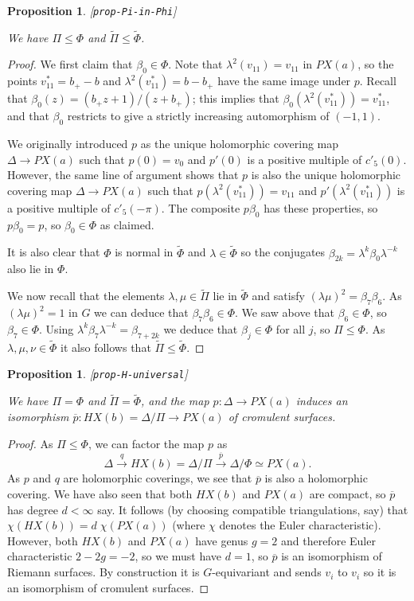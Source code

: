 \documentclass[reqno]{amsart}
\newcommand{\lbl}[1]{\label{#1}\textup{[\texttt{#1}]}\par}
\newcommand{\lbl}{\label}
\newcommand{\Dl}        {\Delta}
\newcommand{\bt}        {\beta}
\newcommand{\lm}        {\lambda}
\newcommand{\xra}       {\xrightarrow}
\newcommand{\ov}[1]     {\overline{#1}}
\newcommand{\tPi}	{\widetilde{\Pi}}
\newcommand{\tPhi}	{\widetilde{\Phi}}
\renewcommand{\:}{\colon}
\newtheorem{proposition}[theorem]{Proposition}
\theoremstyle{definition}
\begin{document}
\begin{proposition}\lbl{prop-Pi-in-Phi}
 We have $\Pi\leq\Phi$ and $\tPi\leq\tPhi$.
\end{proposition}
\begin{proof}
 We first claim that $\bt_0\in\Phi$.  Note that $\lm^2(v_{11})=v_{11}$ in
 $PX(a)$, so the points $v^*_{11}=b_+-b$ and $\lm^2(v^*_{11})=b-b_+$
 have the same image under $p$.  Recall that
 $\bt_0(z)=(b_+z+1)/(z+b_+)$; this implies that
 $\bt_0(\lm^2(v^*_{11}))=v^*_{11}$, and that $\bt_0$ restricts to give
 a strictly increasing automorphism of $(-1,1)$.

 We originally introduced $p$ as the unique holomorphic covering map
 $\Dl\to PX(a)$ such that $p(0)=v_0$ and $p'(0)$ is a positive
 multiple of $c'_5(0)$.  However, the same line of argument shows that
 $p$ is also the unique holomorphic covering map $\Dl\to PX(a)$ such
 that $p(\lm^2(v^*_{11}))=v_{11}$ and $p'(\lm^2(v^*_{11}))$ is a
 positive multiple of $c'_5(-\pi)$.  The composite $p\bt_0$ has these
 properties, so $p\bt_0=p$, so $\bt_0\in\Phi$ as claimed.

 It is also clear that $\Phi$ is normal in $\tPhi$ and $\lm\in\tPhi$
 so the conjugates $\bt_{2k}=\lm^k\bt_0\lm^{-k}$ also lie in $\Phi$.

 We now recall that the elements $\lm,\mu\in\tPi$ lie in $\tPhi$ and
 satisfy $(\lm\mu)^2=\bt_7\bt_6$.  As $(\lm\mu)^2=1$ in $G$ we can
 deduce that $\bt_7\bt_6\in\Phi$.  We saw above that $\bt_6\in\Phi$,
 so $\bt_7\in\Phi$.  Using $\lm^k\bt_7\lm^{-k}=\bt_{7+2k}$ we deduce
 that $\bt_j\in\Phi$ for all $j$, so $\Pi\leq\Phi$.  As
 $\lm,\mu,\nu\in\tPhi$ it also follows that $\tPi\leq\tPhi$.
\end{proof}

\begin{proposition}\lbl{prop-H-universal}
 We have $\Pi=\Phi$ and $\tPi=\tPhi$, and the map $p\:\Dl\to PX(a)$
 induces an isomorphism $\ov{p}\:HX(b)=\Dl/\Pi\to PX(a)$ of cromulent
 surfaces.
\end{proposition}
\begin{proof}
 As $\Pi\leq\Phi$, we can factor the map $p$ as
 \[ \Dl \xra{q} HX(b) = \Dl/\Pi \xra{\ov{p}} \Dl/\Phi \simeq PX(a).
 \]
 As $p$ and $q$ are holomorphic coverings, we see that $\ov{p}$ is
 also a holomorphic covering.  We have also seen that both $HX(b)$ and
 $PX(a)$ are compact, so $\ov{p}$ has degree $d<\infty$ say.  It
 follows (by choosing compatible triangulations, say) that
 $\chi(HX(b))=d\;\chi(PX(a))$ (where $\chi$ denotes the Euler
 characteristic).  However, both $HX(b)$ and $PX(a)$ have genus $g=2$
 and therefore Euler characteristic $2-2g=-2$, so we must have $d=1$,
 so $\ov{p}$ is an isomorphism of Riemann surfaces.  By construction
 it is $G$-equivariant and sends $v_i$ to $v_i$ so it is an
 isomorphism of cromulent surfaces.
\end{proof}
\end{document}
